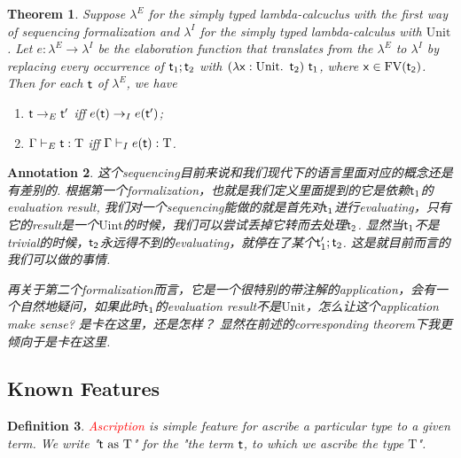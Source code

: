 \documentclass{article}
\theoremstyle{plain}
\newtheorem{theorem}{Theorem}
\newtheorem{definition}[theorem]{Definition}
\newtheorem{annotation}[theorem]{Annotation}
\theoremstyle{nonumberplain}
\newcommand*{\xfunc}[4]{{#2}\colon{#3}{#1}{#4}}
\newcommand*{\func}[3]{\xfunc{\to}{#1}{#2}{#3}}
\newcommand{\lam}[2]{\ensuremath{\lambda #1\ldotp~ #2}} %
\newcommand{\singletype}[1]{\text{#1}}
\newcommand{\termtype}[2]{\ensuremath{#1:#2}}
\newcommand{\term}[1]{\ensuremath\mathsf{#1}}
\newcommand{\seq}[2]{#1;#2}
\newcommand{\redt}[1]{\textcolor{red}{#1}}
\begin{document}
\begin{theorem}
\rm Suppose $\lambda^E$ for the simply typed lambda-calcuclus with the first way of sequencing formalization and $\lambda^I$ for the simply typed lambda-calculus with $\singletype{Unit}$. Let $\func{e}{\lambda^E}{\lambda^I}$ be the elaboration function that translates from the $\lambda^E$ to $\lambda^I$ by replacing every occurrence of $\seq{\term{t}_1}{\term{t}_2}$ with $(\lam{\termtype{\term{x}}{\singletype{Unit}}}{\term{t}_2})~\term{t}_1$, where $\term{x} \in \text{FV}(\term{t_2})$. Then for each $\term{t}$ of $\lambda^E$, we have 
\begin{enumerate}
	\item $\term{t} \to_E \term{t}'$ iff $e(\term{t}) \to _I e(\term{t}')$;
	\item $\Gamma \vdash_E \termtype{\term{t}}{\singletype{T}}$ iff $\Gamma \vdash_I \termtype{e(\term{t})}{\singletype{T}}$. 
\end{enumerate} 
\end{theorem}

\begin{annotation}
\rm 这个sequencing目前来说和我们现代下的语言里面对应的概念还是有差别的. 根据第一个formalization，也就是我们定义里面提到的它是依赖$\term{t}_1$的evaluation result, 我们对一个sequencing能做的就是首先对$\term{t}_1$进行evaluating，只有它的result是一个$\singletype{Uint}$的时候，我们可以尝试丢掉它转而去处理$\term{t}_2$.  显然当$\term{t}_1$不是trivial的时候，$\term{t_2}$永远得不到的evaluating，就停在了某个$\seq{\term{t}_1'}{\term{t}_2}$. 这是就目前而言的我们可以做的事情. 

再关于第二个formalization而言，它是一个很特别的带注解的application，会有一个自然地疑问，如果此时$\term{t}_1$的evaluation result不是$\singletype{Unit}$，怎么让这个application make sense? 是卡在这里，还是怎样？ 显然在前述的corresponding theorem下我更倾向于是卡在这里.
\end{annotation}

\newpage
\subsection{Known Features}

\begin{definition}
\rm \redt{Ascription} is simple feature for ascribe a particular type to a given term. We write "$\term{t}~\text{as}~\singletype{T}$" for the "the term $\term{t}$, to which we ascribe the type $\singletype{T}$".  
\end{definition}
\end{document}
